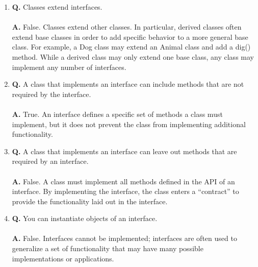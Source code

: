 \documentclass[12pt]{article}
\begin{document}
\begin{enumerate}
\begin{enumerate}[label=\Alph*]
    \\
    \item \textbf{Q.} Classes extend interfaces.
    \\\\
    \textbf{A.}
    False. Classes extend other classes. In particular, derived classes often extend base classes in order to add specific behavior to a more general base class. For example, a Dog class may extend an Animal class and add a dig() method. While a derived class may only extend one base class, any class may implement any number of interfaces.
    \\
    \item \textbf{Q.} A class that implements an interface can include methods that are not required by the interface.
    \\\\
    \textbf{A.}
    True. An interface defines a specific set of methods a class must implement, but it does not prevent the class from implementing additional functionality.
    \\
    \item \textbf{Q.} A class that implements an interface can leave out methods that are required by an interface.
    \\\\
    \textbf{A.}
    False. A class must implement all methods defined in the API of an interface. By implementing the interface, the class enters a ``contract'' to provide the functionality laid out in the interface.
    \\
    \item \textbf{Q.} You can instantiate objects of an interface.
    \\\\
    \textbf{A.}
    False. Interfaces cannot be implemented; interfaces are often used to generalize a set of functionality that may have many possible implementations or applications.
    \\
  \end{enumerate}
\end{enumerate}

 
\end{document}
